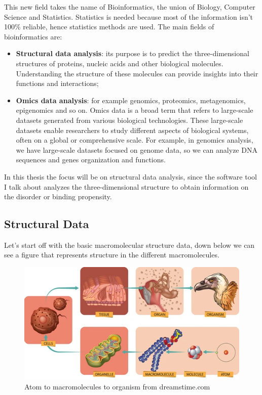 This new field takes the name of Bioinformatics, the union of Biology, Computer Science and Statistics. Statistics is needed because most of the information isn't 100\% reliable, hence statistics methods are used.
The main fields of bioinformatics are:
\begin{itemize}
    \item \textbf{Structural data analysis}: its purpose is to predict the three-dimensional structures of proteins, nucleic acids and other biological molecules. Understanding the structure of these molecules can provide insights into their functions and interactions;
    \item \textbf{Omics data analysis}: for example genomics, proteomics, metagenomics, epigenomics and so on. Omics data is a broad term that refers to large-scale datasets generated from various biological technologies. These large-scale datasets enable researchers to study different aspects of biological systems, often on a global or comprehensive scale. For example, in genomics analysis, we have large-scale datasets focused on genome data, so we can analyze DNA sequences and genes organization and functions.
\end{itemize}

In this thesis the focus will be on structural data analysis, since the software tool I talk about analyzes the three-dimensional structure to obtain information on the disorder or binding propensity.

\vspace{5em}

\subsection{Structural Data}
Let's start off with the basic macromolecular structure data, down below we can see a figure that represents structure in the different macromolecules.
\pagebreak

\begin{figure}[h!]
    \centering
    \includegraphics{res/proteins_overview/atom_bird.png}
    \caption{Atom to macromolecules to organism from dreamstime.com \cite{atombird}}
    \label{fig:atom-bird}
\end{figure}

